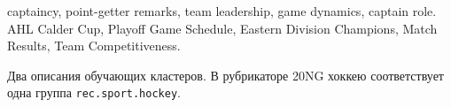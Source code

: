  captaincy, point-getter remarks, team leadership, game dynamics, captain role.
 AHL Calder Cup, Playoff Game Schedule, Eastern Division Champions, Match Results, Team Competitiveness.
\par\medskip Два описания обучающих кластеров. В рубрикаторе 20NG хоккею соответствует одна группа \texttt{rec.sport.hockey}.
